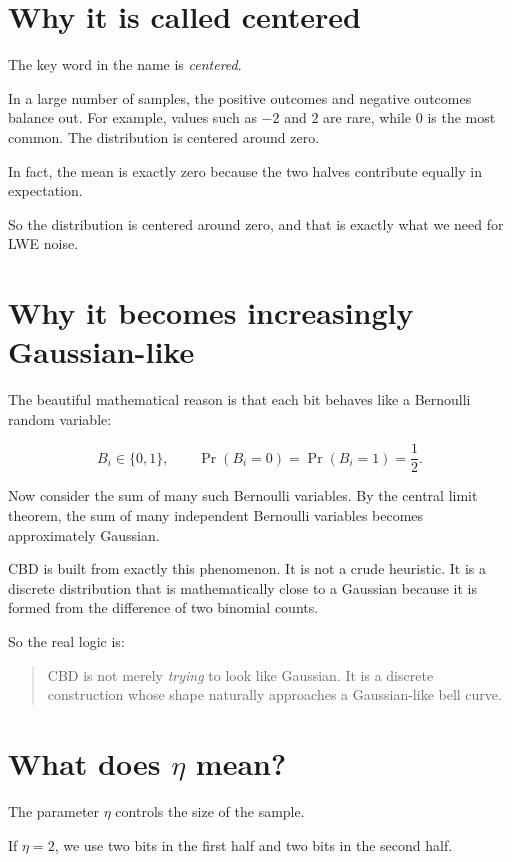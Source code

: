 \section{Why it is called centered}

The key word in the name is \textit{centered}.

In a large number of samples, the positive outcomes and negative outcomes balance out. For example, values such as \(-2\) and \(2\) are rare, while \(0\) is the most common. The distribution is centered around zero.

In fact, the mean is exactly zero because the two halves contribute equally in expectation.

So the distribution is centered around zero, and that is exactly what we need for LWE noise.

\section{Why it becomes increasingly Gaussian-like}

The beautiful mathematical reason is that each bit behaves like a Bernoulli random variable:

\[
B_i \in \{0,1\}, \qquad \Pr(B_i=0)=\Pr(B_i=1)=\frac{1}{2}.
\]

Now consider the sum of many such Bernoulli variables. By the central limit theorem, the sum of many independent Bernoulli variables becomes approximately Gaussian.

CBD is built from exactly this phenomenon. It is not a crude heuristic. It is a discrete distribution that is mathematically close to a Gaussian because it is formed from the difference of two binomial counts.

So the real logic is:

\begin{quote}
CBD is not merely \textit{trying} to look like Gaussian. It is a discrete construction whose shape naturally approaches a Gaussian-like bell curve.
\end{quote}

\section{What does \(\eta\) mean?}

The parameter \(\eta\) controls the size of the sample.

If \(\eta=2\), we use two bits in the first half and two bits in the second half.

